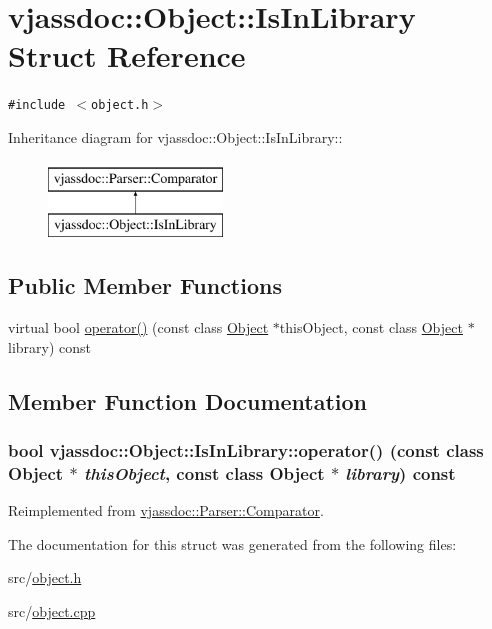 \hypertarget{structvjassdoc_1_1Object_1_1IsInLibrary}{
\section{vjassdoc::Object::IsInLibrary Struct Reference}
\label{structvjassdoc_1_1Object_1_1IsInLibrary}
}
{\tt \#include $<$object.h$>$}

Inheritance diagram for vjassdoc::Object::IsInLibrary::\begin{figure}[H]
\begin{center}
\leavevmode
\includegraphics[height=2cm]{structvjassdoc_1_1Object_1_1IsInLibrary}
\end{center}
\end{figure}
\subsection*{Public Member Functions}
\begin{CompactItemize}
\item 
virtual bool \hyperlink{structvjassdoc_1_1Object_1_1IsInLibrary_a1a041f942f665e8f62e30fa2ad3b260}{operator()} (const class \hyperlink{classvjassdoc_1_1Object}{Object} $\ast$thisObject, const class \hyperlink{classvjassdoc_1_1Object}{Object} $\ast$library) const 
\end{CompactItemize}


\subsection{Member Function Documentation}
\hypertarget{structvjassdoc_1_1Object_1_1IsInLibrary_a1a041f942f665e8f62e30fa2ad3b260}{
\subsubsection{\setlength{\rightskip}{0pt plus 5cm}bool vjassdoc::Object::IsInLibrary::operator() (const class {\bf Object} $\ast$ {\em thisObject}, const class {\bf Object} $\ast$ {\em library}) const}}
\label{structvjassdoc_1_1Object_1_1IsInLibrary_a1a041f942f665e8f62e30fa2ad3b260}




Reimplemented from \hyperlink{structvjassdoc_1_1Parser_1_1Comparator_c27d6790182d87751bcf134a0d01481a}{vjassdoc::Parser::Comparator}.

The documentation for this struct was generated from the following files:\begin{CompactItemize}
\item 
src/\hyperlink{object_8h}{object.h}\item 
src/\hyperlink{object_8cpp}{object.cpp}\end{CompactItemize}
